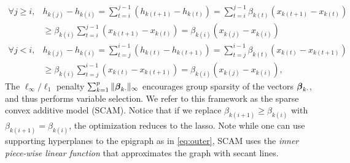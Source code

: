 \begin{align*}
  \forall j\geq{}i, &h_{k(j)}-h_{k(i)}  = 
            \sum\limits_{t=i}^{j-1}(h_{k(t+1)}-h_{k(t)}) = 
            \sum\limits_{t=i}^{j-1}\beta_{k(t)}(x_{k(t+1)}-x_{k(t)})\\ 
      & \geq \beta_{k(i)}\sum\limits_{t=i}^{j-1}(x_{k(t+1)}-x_{k(t)}) = \beta_{k(i)}(x_{k(j)}-x_{k(i)}) \\
  \forall j<i, &h_{k(j)}-h_{k(i)} =
                \sum\limits_{t=j}^{i-1}(h_{k(t)}-h_{k(t+1)}) = 
                \sum\limits_{t=j}^{i-1}\beta_{k(t)}(x_{k(t)}-x_{k(t+1)}) \\ 
     & \geq \beta_{k(i)}\sum\limits_{t=j}^{i-1}(x_{k(t)}-x_{k(t+1)}) = \beta_{k(i)}(x_{k(j)}-x_{k(i)}), 
\end{align*}
The $\ell_\infty/\ell_1$ penalty
$\sum_{k=1}^{p}\|\boldsymbol{\beta}_{k\cdot}\|_{\infty}$ encourages group
sparsity of the vectors $\boldsymbol{\beta}_{k\cdot}$, and thus performs
variable selection.  We refer to this framework as the sparse convex
additive model (SCAM). Notice that if we replace $\beta_{k(i+1)} \geq
\beta_{k(i)}$ with $\beta_{k(i+1)}=\beta_{k(i)}$, the optimization
reduces to the lasso.  Note while one can use
supporting hyperplanes to the epigraph as in \eqref{eq:outer}, 
SCAM uses the \emph{inner  piece-wise linear function}
that approximates the graph with secant lines.




